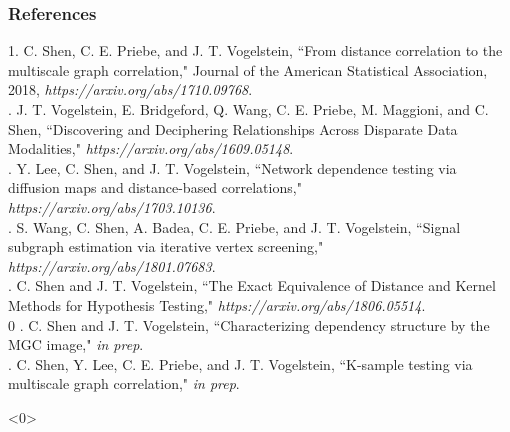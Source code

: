 \documentclass[mathserif,t]{beamer}
\newcommand{\blind}{0}
\begin{document}
%
%

\begin{frame}%
\frametitle{References}
\small

1. \textcolor{UniOrange}{C. Shen}, C. E. Priebe, and J. T. Vogelstein, ``From distance correlation to the
multiscale graph correlation," Journal of the American Statistical Association, 2018, \textit{https://arxiv.org/abs/1710.09768}.\\
. J. T. Vogelstein, E. Bridgeford, Q. Wang, C. E. Priebe, M. Maggioni, and \textcolor{UniOrange}{C. Shen},
``Discovering and Deciphering Relationships Across Disparate Data Modalities," \textit{https://arxiv.org/abs/1609.05148}.\\
. Y. Lee, \textcolor{UniOrange}{C. Shen}, and J. T. Vogelstein, ``Network dependence testing via diffusion
maps and distance-based correlations," \textit{https://arxiv.org/abs/1703.10136}.\\
. S. Wang, \textcolor{UniOrange}{C. Shen}, A. Badea, C. E. Priebe, and J. T. Vogelstein, ``Signal
subgraph estimation via iterative vertex screening," \textit{https://arxiv.org/abs/1801.07683}.\\
. \textcolor{UniOrange}{C. Shen} and J. T. Vogelstein, ``The Exact Equivalence of Distance and Kernel Methods for Hypothesis Testing," \textit{https://arxiv.org/abs/1806.05514}.\\
\blind
{
. \textcolor{UniOrange}{C. Shen} and J. T. Vogelstein, ``Characterizing dependency structure by the MGC image," \textit{in prep}.\\
. \textcolor{UniOrange}{C. Shen}, Y. Lee, C. E. Priebe, and J. T. Vogelstein, ``K-sample testing via
multiscale graph correlation," \textit{in prep}.
}\fi
%
%
\end{frame}

\addtocounter{framenumber}{-1} 
\begin{frame}<0> 

\end{frame} 
%

\end{document}
